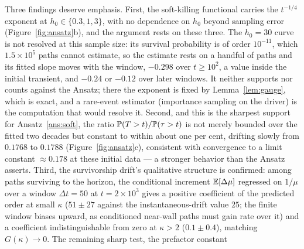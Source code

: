 Three findings deserve emphasis. First, the soft-killing functional
carries the $t^{-1/4}$ exponent at $h_0\in\{0.3,1,3\}$, with no dependence
on $h_0$ beyond sampling error (Figure~\ref{fig:ansatz}b), and the argument
rests on these three. The $h_0=30$ curve is not resolved at this sample
size: its survival probability is of order $10^{-11}$, which $1.5\times10^5$
paths cannot estimate, so the estimate rests on a handful of paths and its
fitted slope moves with the window, $-0.298$ over $t\ge10^2$, a value
inside the initial transient, and $-0.24$ or $-0.12$ over later windows.
It neither supports nor counts against the Ansatz; there the exponent is
fixed by Lemma~\ref{lem:gauge}, which is exact, and a rare-event estimator
(importance sampling on the driver) is the computation that would resolve
it. Second,
and this is the sharpest support for Ansatz~\ref{ans:soft}, the ratio
$\mathbb{P}(T>t)/\mathbb{P}(\tau>t)$ is not merely bounded over the fitted two
decades but constant to within about one per cent, drifting slowly from
$0.1768$ to $0.1788$ (Figure~\ref{fig:ansatz}c), consistent with
convergence to a limit constant $\approx0.178$ at these initial data --- a stronger behavior
than the Ansatz asserts. Third, the survivorship drift's qualitative
structure is confirmed: among paths surviving to the horizon, the
conditional increment $\mathbb{E}[\Delta\mu]$ regressed on $1/\mu$ over a
window $\Delta t=50$ at $t=2\times10^3$ gives a positive coefficient
of the predicted order at small $\kappa$ ($51\pm27$ against the
instantaneous-drift value $25$; the finite window biases upward, as
conditioned near-wall paths must gain rate over it) and a coefficient
indistinguishable from zero at $\kappa>2$ ($0.1\pm0.4$), matching
$G(\kappa)\to0$. The remaining sharp test, the prefactor constant
